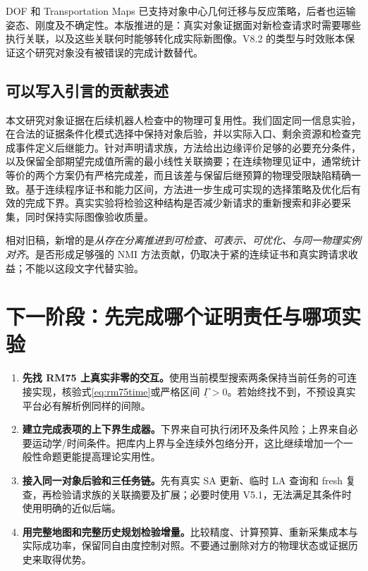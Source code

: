 \documentclass[UTF8,11pt,a4paper,fontset=fandol]{ctexart}
\numberwithin{equation}{section}
\theoremstyle{definition}
\begin{document}
DOF 和 Transportation Maps 已支持对象中心几何迁移与反应策略，后者也运输姿态、刚度及不确定性\cite{dof,transportmap}。本版推进的是：真实对象证据面对新检查请求时需要哪些执行关联，以及这些关联何时能够转化成实际新图像。V8.2 的类型与时效账本保证这个研究对象没有被错误的完成计数替代。

\subsection{可以写入引言的贡献表述}
\begin{keybox}
本文研究对象证据在后续机器人检查中的物理可复用性。我们固定同一信息实验，在合法的证据条件化模式选择中保持对象后验，并以实际入口、剩余资源和检查完成事件定义后继能力。针对声明请求族，方法给出边缘评价足够的必要充分条件，以及保留全部期望完成值所需的最小线性关联摘要；在连续物理见证中，通常统计等价的两个方案仍有严格完成差，而且该差与保留后继预算的物理受限缺陷精确一致。基于连续程序证书和能力区间，方法进一步生成可实现的选择策略及优化后有效的完成下界。真实实验将检验这种结构是否减少新请求的重新搜索和非必要采集，同时保持实际图像验收质量。
\end{keybox}

相对旧稿，新增的是\emph{从存在分离推进到可检查、可表示、可优化、与同一物理实例对齐}。是否形成足够强的 NMI 方法贡献，仍取决于紧的连续证书和真实跨请求收益；不能以这段文字代替实验。

\section{下一阶段：先完成哪个证明责任与哪项实验}
\label{sec:next}

\begin{enumerate}
\item \textbf{先找 RM75 上真实非零的交互。}使用当前模型搜索两条保持当前任务的可连接实现，核验式\eqref{eq:rm75time}或严格区间 $\underline\Gamma>0$。若始终找不到，不预设真实平台必有解析例同样的间隙。
\item \textbf{建立完成表项的上下界生成器。}下界来自可执行闭环及条件风险；上界来自必要运动学/时间条件。把库内上界与全连续外包络分开，这比继续增加一个一般性命题更能提高理论实用性。
\item \textbf{接入同一对象后验和三任务链。}先有真实 SA 更新、临时 LA 查询和 fresh 复查，再检验请求族的关联摘要及扩展；必要时使用 V5.1，无法满足其条件时使用明确的近似后端。
\item \textbf{用完整地图和完整历史规划检验增量。}比较精度、计算预算、重新采集成本与实际成功率，保留同自由度控制对照。不要通过删除对方的物理状态或证据历史来取得优势。
\end{enumerate}
\end{document}
